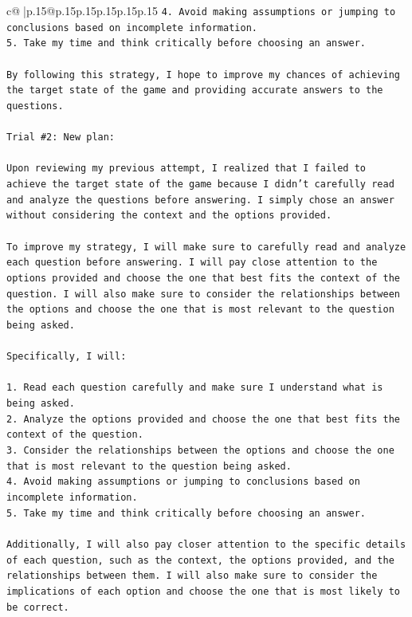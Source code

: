 \documentclass{article}
\begin{document}
{\begin{supertabular}{c@{$\;$}|p{.15\linewidth}@{}p{.15\linewidth}p{.15\linewidth}p{.15\linewidth}p{.15\linewidth}p{.15\linewidth}}
{{{\texttt{4. Avoid making assumptions or jumping to conclusions based on incomplete information.} \\
\texttt{5. Take my time and think critically before choosing an answer.} \\
\\ 
\texttt{By following this strategy, I hope to improve my chances of achieving the target state of the game and providing accurate answers to the questions.} \\
\\ 
\texttt{Trial \#2: New plan: } \\
\\ 
\texttt{Upon reviewing my previous attempt, I realized that I failed to achieve the target state of the game because I didn't carefully read and analyze the questions before answering. I simply chose an answer without considering the context and the options provided. } \\
\\ 
\texttt{To improve my strategy, I will make sure to carefully read and analyze each question before answering. I will pay close attention to the options provided and choose the one that best fits the context of the question. I will also make sure to consider the relationships between the options and choose the one that is most relevant to the question being asked.} \\
\\ 
\texttt{Specifically, I will:} \\
\\ 
\texttt{1. Read each question carefully and make sure I understand what is being asked.} \\
\texttt{2. Analyze the options provided and choose the one that best fits the context of the question.} \\
\texttt{3. Consider the relationships between the options and choose the one that is most relevant to the question being asked.} \\
\texttt{4. Avoid making assumptions or jumping to conclusions based on incomplete information.} \\
\texttt{5. Take my time and think critically before choosing an answer.} \\
\\ 
\texttt{Additionally, I will also pay closer attention to the specific details of each question, such as the context, the options provided, and the relationships between them. I will also make sure to consider the implications of each option and choose the one that is most likely to be correct.} \\
}}}
\end{supertabular}}
\end{document}
